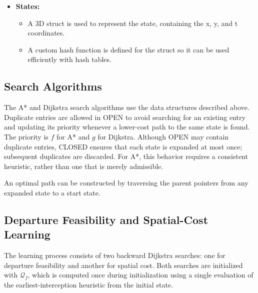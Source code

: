 \documentclass[11pt]{article}
\begin{document}
\begin{itemize}
  \item \textbf{States:}
        \begin{itemize}
          \item A 3D struct is used to represent the state, containing the x, y, and t coordinates.
          \item A custom hash function is defined for the struct so it can be used efficiently with hash tables.
        \end{itemize}
\end{itemize}

\subsection{Search Algorithms}

The A* and Dijkstra search algorithms use the data structures described above. Duplicate entries are allowed in OPEN to avoid searching for an existing entry and updating its priority whenever a lower-cost path to the same state is found. The priority is \(f\) for A* and \(g\) for Dijkstra. Although OPEN may contain duplicate entries, CLOSED ensures that each state is expanded at most once; subsequent duplicates are discarded. For A*, this behavior requires a consistent heuristic, rather than one that is merely admissible.

An optimal path can be constructed by traversing the parent pointers from any expanded state to a start state.

\subsection{Departure Feasibility and Spatial-Cost Learning}

The learning process consists of two backward Dijkstra searches: one for
departure feasibility and another for spatial cost. Both searches are
initialized with \(\mathcal{Q}_f\), which is computed once during initialization
using a single evaluation of the earliest-interception heuristic from the
initial state.
\end{document}
